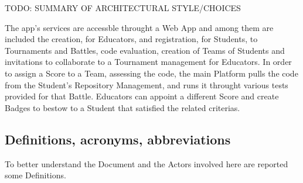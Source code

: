 TODO: SUMMARY OF ARCHITECTURAL STYLE/CHOICES


The app's services are accessble throught a Web App and among them are included the creation, for Educators, and registration, for Students, to Tournaments and Battles, code evaluation, creation of Teams of Students and invitations 
to collaborate to a Tournament management for Educators. 
In order to assign a Score to a Team, assessing the code, the main Platform pulls the code from the Student's Repository Management, and runs it throught various tests provided for that Battle. Educators can appoint a different 
Score and create Badges to bestow to a Student that satisfied the related criterias.
\subsection{Definitions, acronyms, abbreviations}
To better understand the Document and the Actors involved here are reported some Definitions.
